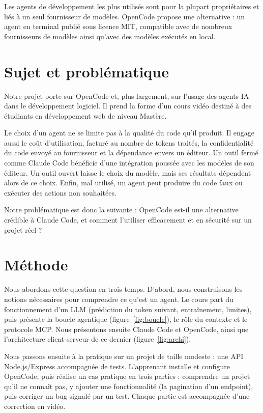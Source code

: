 \documentclass[11pt,a4paper]{article}
\begin{document}
Les agents de développement les plus utilisés sont pour la plupart propriétaires et liés à un seul fournisseur de modèles. OpenCode \citep{opencode} propose une alternative : un agent en terminal publié sous licence MIT, compatible avec de nombreux fournisseurs de modèles ainsi qu'avec des modèles exécutés en local.

\section*{Sujet et problématique}

Notre projet porte sur OpenCode et, plus largement, sur l'usage des agents IA dans le développement logiciel. Il prend la forme d'un cours vidéo destiné à des étudiants en développement web de niveau Mastère.

Le choix d'un agent ne se limite pas à la qualité du code qu'il produit. Il engage aussi le coût d'utilisation, facturé au nombre de tokens traités, la confidentialité du code envoyé au fournisseur et la dépendance envers un éditeur. Un outil fermé comme Claude Code bénéficie d'une intégration poussée avec les modèles de son éditeur. Un outil ouvert laisse le choix du modèle, mais ses résultats dépendent alors de ce choix. Enfin, mal utilisé, un agent peut produire du code faux ou exécuter des actions non souhaitées.

Notre problématique est donc la suivante : OpenCode est-il une alternative crédible à Claude Code, et comment l'utiliser efficacement et en sécurité sur un projet réel ?

\section*{Méthode}

Nous abordons cette question en trois temps. D'abord, nous construisons les notions nécessaires pour comprendre ce qu'est un agent. Le cours part du fonctionnement d'un LLM (prédiction du token suivant, entraînement, limites), puis présente la boucle agentique (figure~\ref{fig:boucle}), le rôle du contexte et le protocole MCP. Nous présentons ensuite Claude Code et OpenCode, ainsi que l'architecture client-serveur de ce dernier (figure~\ref{fig:archi}).

Nous passons ensuite à la pratique sur un projet de taille modeste : une API Node.js/Express accompagnée de tests. L'apprenant installe et configure OpenCode, puis réalise un cas pratique en trois parties : comprendre un projet qu'il ne connaît pas, y ajouter une fonctionnalité (la pagination d'un endpoint), puis corriger un bug signalé par un test. Chaque partie est accompagnée d'une correction en vidéo.
\end{document}
